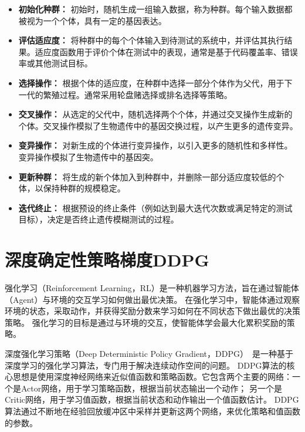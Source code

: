 \begin{itemize}
  \item \textbf{初始化种群：} 初始时，随机生成一组输入数据，称为种群。每个输入数据都被视为一个个体，具有一定的基因表达。
  \item \textbf{评估适应度：} 将种群中的每个个体输入到待测试的系统中，并评估其执行结果。适应度函数用于评价个体在测试中的表现，通常是基于代码覆盖率、错误率或其他测试目标。
  \item \textbf{选择操作：} 根据个体的适应度，在种群中选择一部分个体作为父代，用于下一代的繁殖过程。通常采用轮盘赌选择或排名选择等策略。
  \item \textbf{交叉操作：} 从选定的父代中，随机选择两个个体，并通过交叉操作生成新的个体。交叉操作模拟了生物遗传中的基因交换过程，以产生更多的遗传变异。
  \item \textbf{变异操作：} 对新生成的个体进行变异操作，以引入更多的随机性和多样性。变异操作模拟了生物遗传中的基因突。
  \item \textbf{更新种群：} 将生成的新个体加入到种群中，并删除一部分适应度较低的个体，以保持种群的规模稳定。
  \item \textbf{迭代终止：} 根据预设的终止条件（例如达到最大迭代次数或满足特定的测试目标），决定是否终止遗传模糊测试的过程。
\end{itemize}

\section{深度确定性策略梯度DDPG}
强化学习（Reinforcement Learning，RL）是一种机器学习方法，旨在通过智能体（Agent）与环境的交互学习如何做出最优决策。
在强化学习中，智能体通过观察环境的状态，采取动作，并获得奖励分数来学习如何在不同状态下做出最优的决策策略。
强化学习的目标是通过与环境的交互，使智能体学会最大化累积奖励的策略。

深度强化学习策略（Deep Deterministic Policy Gradient，DDPG）~\cite{lillicrap2015continuous}是一种基于深度学习的强化学习算法，专门用于解决连续动作空间的问题。
DDPG算法的核心思想是使用深度神经网络来近似值函数和策略函数。它包含两个主要的网络：一个是Actor网络，用于学习策略函数，根据当前状态输出一个动作；
另一个是Critic网络，用于学习值函数，根据当前状态和动作输出一个值函数估计。
DDPG算法通过不断地在经验回放缓冲区中采样并更新这两个网络，来优化策略和值函数的参数。

